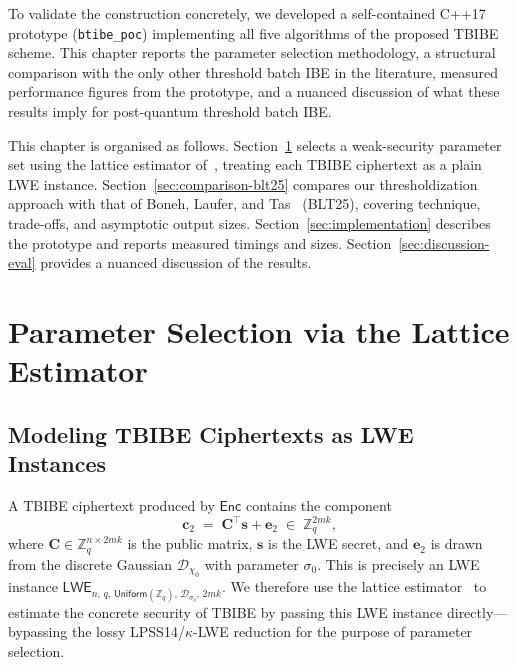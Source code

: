 \label{chapter:Experiment}

To validate the construction concretely, we developed a self-contained C++17 prototype
(\texttt{btibe\_poc}) implementing all five algorithms of the proposed TBIBE scheme.
This chapter reports the parameter selection methodology, a structural comparison with the
only other threshold batch IBE in the literature, measured performance figures from the
prototype, and a nuanced discussion of what these results imply for post-quantum threshold
batch IBE.

This chapter is organised as follows.
Section~\ref{sec:param-select} selects a weak-security parameter set using the lattice
estimator of~\cite{EC:ADPS16}, treating each TBIBE ciphertext as a plain LWE instance.
Section~\ref{sec:comparison-blt25} compares our thresholdization approach with that of
Boneh, Laufer, and Tas~\cite{EPRINT:BonLauTas25} (\textsf{BLT25}), covering technique,
trade-offs, and asymptotic output sizes.
Section~\ref{sec:implementation} describes the prototype and reports measured timings and
sizes.
Section~\ref{sec:discussion-eval} provides a nuanced discussion of the results.

\section{Parameter Selection via the Lattice Estimator}
\label{sec:param-select}

\subsection{Modeling TBIBE Ciphertexts as LWE Instances}

A TBIBE ciphertext produced by $\mathsf{Enc}$ contains the component
\[
    \mathbf{c}_2 \;=\; \mathbf{C}^\top \mathbf{s} + \mathbf{e}_2
    \;\in\; \mathbb{Z}_q^{2mk},
\]
where $\mathbf{C}\in\mathbb{Z}_q^{n\times 2mk}$ is the public matrix, $\mathbf{s}$ is the
LWE secret, and $\mathbf{e}_2$ is drawn from the discrete Gaussian $\mathcal{D}_{\chi_0}$
with parameter $\sigma_0$.
This is precisely an LWE instance $\mathsf{LWE}_{n,\,q,\,\mathsf{Uniform}(\mathbb{Z}_q),\,\mathcal{D}_{\sigma_0},\,2mk}$.
We therefore use the lattice estimator~\cite{EC:ADPS16} to estimate the concrete security
of TBIBE by passing this LWE instance directly—bypassing the lossy LPSS14/$\kappa$-LWE
reduction for the purpose of parameter selection.

